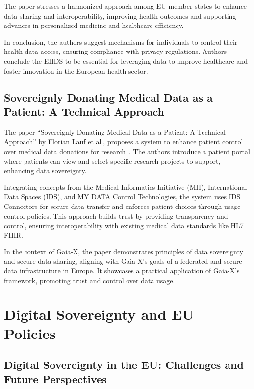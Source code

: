 The paper stresses a harmonized approach among EU member states to enhance data sharing and interoperability, improving health outcomes and supporting advances in personalized medicine and healthcare efficiency.

In conclusion, the authors suggest mechanisms for individuals to control their health data access, ensuring compliance with privacy regulations.
Authors conclude the EHDS to be essential for leveraging data to improve healthcare and foster innovation in the European health sector.

\subsection{Sovereignly Donating Medical Data as a Patient: A Technical Approach}\label{subsec:sovereignly-donating-medical-data-as-a-patient:-a-technical-approach}

The paper ``Sovereignly Donating Medical Data as a Patient: A Technical Approach'' by Florian Lauf et al., proposes a system to enhance patient control over medical data donations for research~\cite{sovereignly_donating_medical_data}.
The authors introduce a patient portal where patients can view and select specific research projects to support, enhancing data sovereignty.

Integrating concepts from the Medical Informatics Initiative (MII), International Data Spaces (IDS), and MY DATA Control Technologies, the system uses IDS Connectors for secure data transfer and enforces patient choices through usage control policies.
This approach builds trust by providing transparency and control, ensuring interoperability with existing medical data standards like HL7 FHIR.

In the context of Gaia-X, the paper demonstrates principles of data sovereignty and secure data sharing, aligning with Gaia-X's goals of a federated and secure data infrastructure in Europe.
It showcases a practical application of Gaia-X's framework, promoting trust and control over data usage.

\section{Digital Sovereignty and EU Policies}\label{sec:digital-sovereignty-and-eu-policies}

\subsection{Digital Sovereignty in the EU: Challenges and Future Perspectives}\label{subsec:digital-sovereignty-in-the-eu:-challenges-and-future-perspectives}

